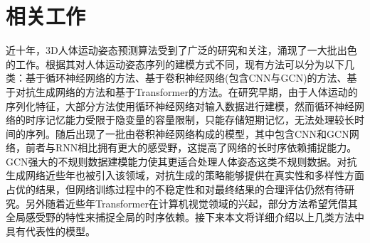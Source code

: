 \chapter{相关工作}


近十年，3D人体运动姿态预测算法受到了广泛的研究和关注，涌现了一大批出色的工作。根据其对人体运动姿态序列的建模方式不同，现有方法可以分为以下几类：基于循环神经网络的方法\parencite{fragkiadaki2015recurrent,jain2016structural,ghosh2017learning,martinez2017human,gui2018adversarial,tang2018long,gui2018few,guo2019human,liu2019towards,chiu2019action,gopalakrishnan2019neural,sang2020human,corona2020context,pavllo2020modeling}、基于卷积神经网络(包含CNN与GCN)的方法\parencite{aksan2019structured,mao2019learning,mao2020history,cui2020learning,li2020dynamic,li2021symbiotic,li2020multitask,liu2020multi,lebailly2020motion,dang2021msr,cui2021towards,Shi:AAAI2022,Shi:CVPR2021,Duan:AAAI2022,butepage2017deep,li2018convolutional,liu2020trajectorycnn}、基于对抗生成网络的方法\parencite{barsoum2018hp,kundu2019bihmp,hernandez2019human,jain2020gan,liu2021aggregated,cui2021efficient,gui2018adversarial,chao2020adversarial,lyu2021learning}和基于Transformer\parencite{aksan2021spatio}的方法。在研究早期，由于人体运动的序列化特征，大部分方法使用循环神经网络对输入数据进行建模，然而循环神经网络的时序记忆能力受限于隐变量的容量限制，只能存储短期记忆，无法处理较长时间的序列。随后出现了一批由卷积神经网络构成的模型，其中包含CNN和GCN网络，前者与RNN相比拥有更大的感受野，这提高了网络的长时序依赖捕捉能力。GCN强大的不规则数据建模能力使其更适合处理人体姿态这类不规则数据。对抗生成网络近些年也被引入该领域，对抗生成的策略能够提供在真实性和多样性方面占优的结果，但网络训练过程中的不稳定性和对最终结果的合理评估仍然有待研究。另外随着近些年Transformer在计算机视觉领域的兴起，部分方法希望凭借其全局感受野的特性来捕捉全局的时序依赖。接下来本文将详细介绍以上几类方法中具有代表性的模型。

